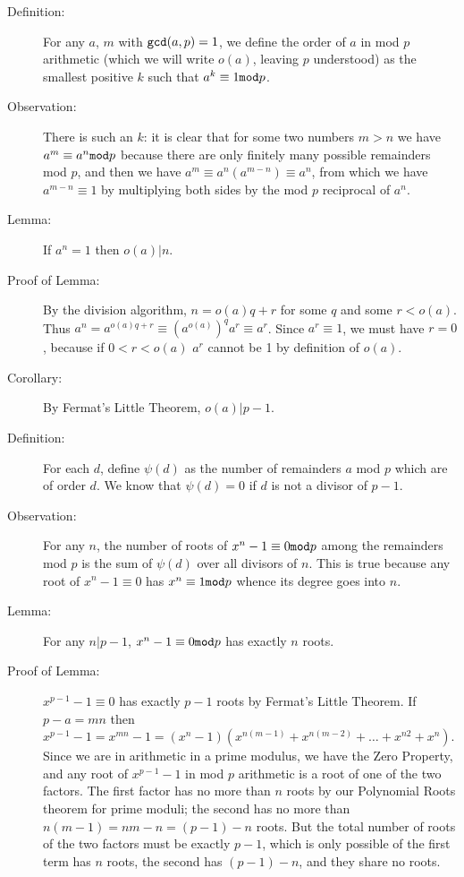 \documentclass[12pt]{article}
\begin{document}
\begin{description}

\item[Definition:]  For any $a$, $m$ with ${\tt gcd}(a,p)=1$, we define the order of $a$ in mod $p$ arithmetic (which we will write $o(a)$, leaving
$p$ understood) as the smallest positive $k$ such that $a^k\equiv 1{\tt mod}p$.

\item[Observation:]  There is such an $k$:  it is clear that for some two numbers $m>n$ we have $a^m\equiv a^n{\tt mod}p$ because there are only finitely many
possible remainders mod $p$, and then we have $a^m\equiv a^n(a^{m-n})\equiv a^n$, from which we have $a^{m-n}\equiv 1$ by multiplying both sides by the mod $p$ reciprocal of $a^n$.

\item[Lemma:]  If $a^n=1$ then $o(a)|n$.

\item[Proof of Lemma:]  By the division algorithm, $n=o(a)q+r$ for some $q$ and some $r<o(a)$.  Thus $a^n=a^{o(a)q+r}\equiv (a^{o(a)})^qa^r\equiv a^r$.
Since $a^r\equiv 1$, we must have $r=0$, because if $0<r<o(a)$ $a^r$ cannot be 1 by definition of $o(a)$.

\item[Corollary:]  By Fermat's Little Theorem, $o(a)|p-1$.

\item[Definition:]   For each $d$, define $\psi(d)$ as the number of remainders $a$ mod $p$ which are of order $d$.  We know that $\psi(d)=0$ if $d$ is not a divisor of
$p-1$.

\item[Observation:]   For any $n$, the number of roots of $x^n-1 \equiv 0{\tt mod}p$ among the remainders mod $p$ is the sum of $\psi(d)$ over all divisors of $n$.
This is true because any root of $x^n-1 \equiv 0$ has $x^n\equiv 1{\tt mod}p$ whence its degree goes into $n$.

\item[Lemma:]  For any $n|p-1$, $x^n-1 \equiv 0{\tt mod}p$  has exactly $n$ roots.

\item[Proof of Lemma:] $x^{p-1}-1 \equiv 0$ has exactly $p-1$ roots by Fermat's Little Theorem.   If $p-a=mn$ then $x^{p-1}-1=x^{mn}-1=(x^n-1)(x^{n(m-1)}+x^{n(m-2)}+\ldots+x^{n2}+x^n)$.   Since we are in arithmetic in a prime modulus,
we have the Zero Property, and any root of $x^{p-1}-1$ in mod $p$ arithmetic is a root of one of the two factors.  The first factor has no more than $n$ roots by our Polynomial Roots theorem for prime moduli; the second has no more
than $n(m-1)=nm-n=(p-1)-n$ roots.  But the total number of roots of the two factors must be exactly $p-1$, which is only possible of the first term has $n$ roots, the second has $(p-1)-n$, and they share no roots.


\end{description}
\end{document}
